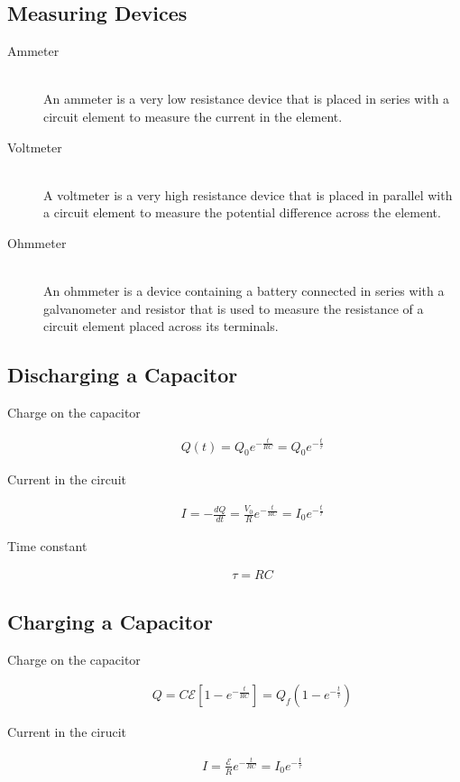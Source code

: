 \documentclass[../main.tex]{subfiles}
\begin{document}
\subsection{Measuring Devices}
\label{sub:measuring_devices}

\begin{description}
  \item[Ammeter] \hfill \\
    An ammeter is a very low resistance device that is placed in series with a
    circuit element to measure the current in the element.
  \item[Voltmeter] \hfill \\
    A voltmeter is a very high resistance device that is placed in parallel
    with a circuit element to measure the potential difference across the
    element.
  \item[Ohmmeter] \hfill \\
    An ohmmeter is a device containing a battery connected in series with a
    galvanometer and resistor that is used to measure the resistance of a
    circuit element placed across its terminals.
\end{description}

\subsection{Discharging a Capacitor}
\label{sub:discharging_a_capacitor}

\begin{description}
  \item[Charge on the capacitor]
    \begin{align}
      Q(t) = Q_0e^{-\frac{t}{RC}} = Q_0e^{-\frac{t}{\tau}}
    \end{align}
  \item[Current in the circuit]
    \begin{align}
      I = -\frac{dQ}{dt} = \frac{V_0}{R} e^{-\frac{t}{RC}} =
      I_0e^{-\frac{t}{\tau}}
    \end{align}
  \item[Time constant]
    \begin{align}
       \tau = RC
    \end{align}
\end{description}

\subsection{Charging a Capacitor}
\label{sub:charging_a_capacitor}

\begin{description}
  \item[Charge on the capacitor]
    \begin{align}
      Q = C\mathcal{E}\left[1-e^{-\frac{t}{RC}}\right] =
      Q_f\left(1-e^{-\frac{t}{\tau}}\right)
    \end{align}
  \item[Current in the cirucit]
    \begin{align}
      I = \frac{\mathcal{E}}{R}e^{-\frac{t}{RC}} = I_0e^{-\frac{t}{\tau}}
    \end{align}
\end{description}
\end{document}
